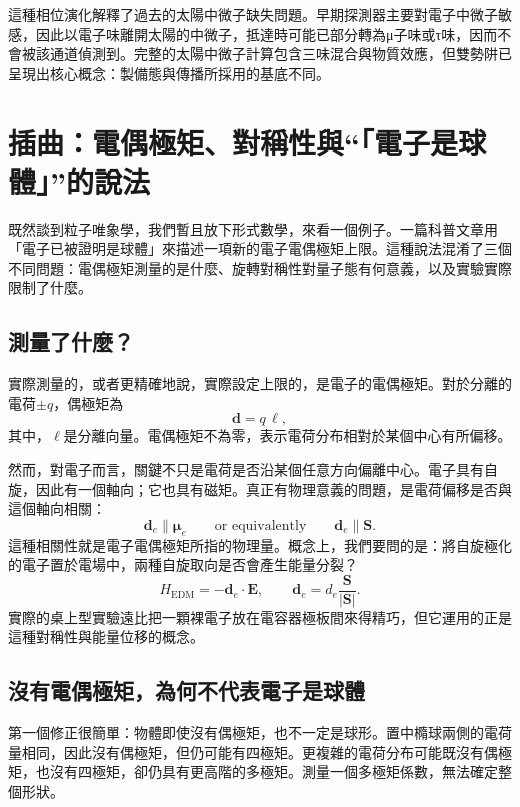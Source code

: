 這種相位演化解釋了過去的太陽中微子缺失問題。早期探測器主要對電子中微子敏感，因此以電子味離開太陽的中微子，抵達時可能已部分轉為{\proseunicodefont μ}子味或{\proseunicodefont τ}味，因而不會被該通道偵測到。完整的太陽中微子計算包含三味混合與物質效應，但雙勢阱已呈現出核心概念：製備態與傳播所採用的基底不同。

\section{插曲：電偶極矩、對稱性與``「電子是球體」''的說法}

既然談到粒子唯象學，我們暫且放下形式數學，來看一個例子。一篇科普文章用「電子已被證明是球體」來描述一項新的電子電偶極矩上限。這種說法混淆了三個不同問題：電偶極矩測量的是什麼、旋轉對稱性對量子態有何意義，以及實驗實際限制了什麼。

\subsection{測量了什麼？}

實際測量的，或者更精確地說，實際設定上限的，是電子的電偶極矩。對於分離的電荷\(\pm q\)，偶極矩為
\begin{equation}
\mathbf d = q\,\boldsymbol{\ell},
\end{equation}
其中，\(\boldsymbol{\ell}\)是分離向量。電偶極矩不為零，表示電荷分布相對於某個中心有所偏移。

然而，對電子而言，關鍵不只是電荷是否沿某個任意方向偏離中心。電子具有自旋，因此有一個軸向；它也具有磁矩。真正有物理意義的問題，是電荷偏移是否與這個軸向相關：
\begin{equation}
\mathbf d_e \parallel \boldsymbol{\mu}_e
\qquad \text{or equivalently} \qquad
\mathbf d_e \parallel \mathbf S .
\end{equation}
這種相關性就是電子電偶極矩所指的物理量。概念上，我們要問的是：將自旋極化的電子置於電場中，兩種自旋取向是否會產生能量分裂？
\begin{equation}
H_{\mathrm{EDM}}=-\mathbf d_e\cdot \mathbf E,
\qquad
\mathbf d_e=d_e\frac{\mathbf S}{|\mathbf S|}.
\end{equation}
實際的桌上型實驗遠比把一顆裸電子放在電容器極板間來得精巧，但它運用的正是這種對稱性與能量位移的概念。

\subsection{沒有電偶極矩，為何不代表電子是球體}

第一個修正很簡單：物體即使沒有偶極矩，也不一定是球形。置中橢球兩側的電荷量相同，因此沒有偶極矩，但仍可能有四極矩。更複雜的電荷分布可能既沒有偶極矩，也沒有四極矩，卻仍具有更高階的多極矩。測量一個多極矩係數，無法確定整個形狀。

